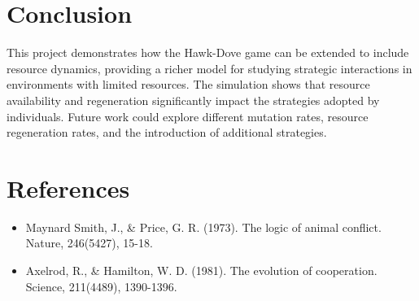 \documentclass{article}
\begin{document}
\section{Conclusion}
This project demonstrates how the Hawk-Dove game can be extended to include resource dynamics, providing a richer model for studying strategic interactions in environments with limited resources. The simulation shows that resource availability and regeneration significantly impact the strategies adopted by individuals. Future work could explore different mutation rates, resource regeneration rates, and the introduction of additional strategies.

\section{References}
\begin{itemize}
    \item Maynard Smith, J., \& Price, G. R. (1973). The logic of animal conflict. Nature, 246(5427), 15-18.
    \item Axelrod, R., \& Hamilton, W. D. (1981). The evolution of cooperation. Science, 211(4489), 1390-1396.
\end{itemize}
\end{document}
